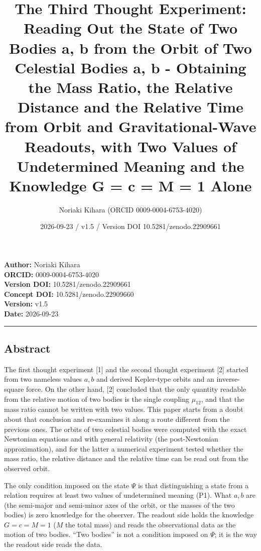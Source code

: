 \documentclass[
  a4paper,
]{article}
\title{The Third Thought Experiment: Reading Out the State of Two Bodies
a, b from the Orbit of Two Celestial Bodies a, b - Obtaining the Mass
Ratio, the Relative Distance and the Relative Time from Orbit and
Gravitational-Wave Readouts, with Two Values of Undetermined Meaning and
the Knowledge G = c = M = 1 Alone}
\author{Noriaki Kihara (ORCID 0009-0004-6753-4020)}
\date{2026-09-23 / v1.5 / Version DOI 10.5281/zenodo.22909661}
\begin{document}
\maketitle

\textbf{Author:} Noriaki Kihara\\
\textbf{ORCID:} 0009-0004-6753-4020\\
\textbf{Version DOI:} 10.5281/zenodo.22909661\\
\textbf{Concept DOI:} 10.5281/zenodo.22909660\\
\textbf{Version:} v1.5\\
\textbf{Date:} 2026-09-23

\begin{center}\rule{0.5\linewidth}{0.5pt}\end{center}

\subsection{Abstract}\label{abstract}

The first thought experiment {[}1{]} and the second thought experiment
{[}2{]} started from two nameless values \(a, b\) and derived
Kepler-type orbits and an inverse-square force. On the other hand,
{[}2{]} concluded that the only quantity readable from the relative
motion of two bodies is the single coupling \(\mu_{12}\), and that the
mass ratio cannot be written with two values. This paper starts from a
doubt about that conclusion and re-examines it along a route different
from the previous ones. The orbits of two celestial bodies were computed
with the exact Newtonian equations and with general relativity (the
post-Newtonian approximation), and for the latter a numerical experiment
tested whether the mass ratio, the relative distance and the relative
time can be read out from the observed orbit.

The only condition imposed on the state \(\Psi\) is that distinguishing
a state from a relation requires at least two values of undetermined
meaning (P1). What \(a, b\) are (the semi-major and semi-minor axes of
the orbit, or the masses of the two bodies) is zero knowledge for the
observer. The readout side holds the knowledge \(G=c=M=1\) (\(M\) the
total mass) and reads the observational data as the motion of two
bodies. ``Two bodies'' is not a condition imposed on \(\Psi\); it is the
way the readout side reads the data.
\end{document}
